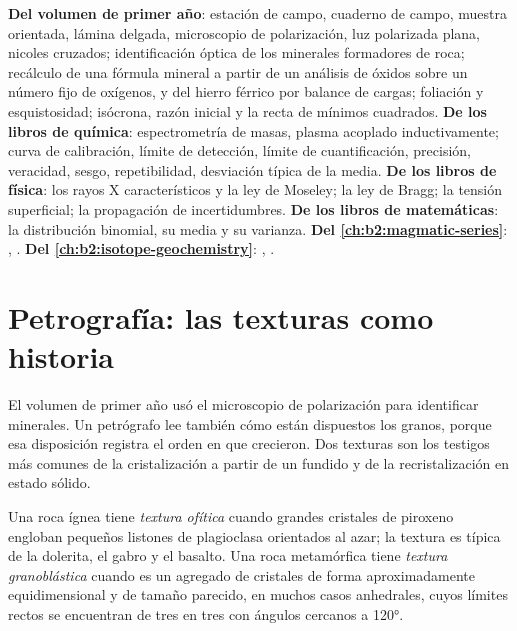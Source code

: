 \begin{recall}
\textbf{Del volumen de primer año}: estación de campo, cuaderno de campo, muestra orientada, lámina delgada,
microscopio de polarización, luz polarizada plana, nicoles cruzados; identificación óptica de los minerales
formadores de roca; recálculo de una fórmula mineral a partir de un análisis de óxidos sobre un número fijo de oxígenos,
y del hierro férrico por balance de cargas; foliación y esquistosidad; isócrona, razón inicial y la
recta de mínimos cuadrados. \textbf{De los libros de química}: espectrometría de masas, plasma acoplado inductivamente;
curva de calibración, límite de detección, límite de cuantificación, precisión, veracidad, sesgo,
repetibilidad, desviación típica de la media. \textbf{De los libros de física}: los rayos X característicos
y la ley de Moseley; la ley de Bragg; la tensión superficial; la propagación de incertidumbres.
\textbf{De los libros de matemáticas}: la distribución binomial, su media y su varianza.
\textbf{Del \cref{ch:b2:magmatic-series}}: , .
\textbf{Del \cref{ch:b2:isotope-geochemistry}}: , .
\end{recall}

\section{Petrografía: las texturas como historia}\label{sec:b2:field-lab-methods-2:petrography}

El volumen de primer año usó el microscopio de polarización para identificar minerales. Un petrógrafo lee también
cómo están dispuestos los granos, porque esa disposición registra el orden en que crecieron. Dos
texturas son los testigos más comunes de la cristalización a partir de un fundido y de la recristalización en
estado sólido.

\begin{definition}\label{def:b2:field-lab-methods-2:textures}
Una roca ígnea tiene \emph{textura ofítica} cuando grandes cristales de piroxeno
engloban pequeños listones de plagioclasa orientados al azar; la textura es típica de la dolerita, el gabro
y el basalto. Una roca metamórfica tiene \emph{textura granoblástica} cuando
es un agregado de cristales de forma aproximadamente equidimensional y de tamaño parecido, en muchos casos anhedrales,
cuyos límites rectos se encuentran de tres en tres con ángulos cercanos a \ang{120}.
\end{definition}

